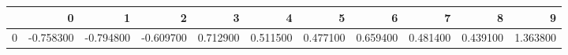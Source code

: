 \begin{tabular}{lrrrrrrrrrr}
\toprule
 & 0 & 1 & 2 & 3 & 4 & 5 & 6 & 7 & 8 & 9 \\
\midrule
0 & -0.758300 & -0.794800 & -0.609700 & 0.712900 & 0.511500 & 0.477100 & 0.659400 & 0.481400 & 0.439100 & 1.363800 \\
\bottomrule
\end{tabular}
